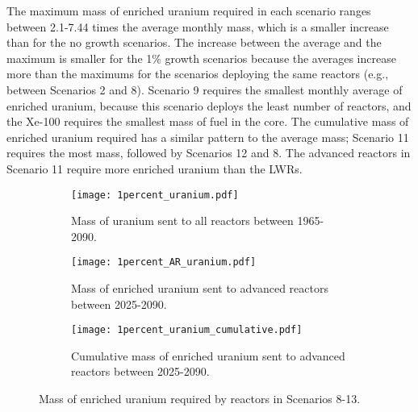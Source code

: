 The maximum mass of enriched uranium required in each scenario ranges 
between 2.1-7.44 times the average monthly mass, which is a smaller increase 
than for the no growth scenarios. The increase between 
the average and the maximum is smaller for the 1\% growth scenarios because
the averages increase more than the maximums for the scenarios deploying the 
same reactors (e.g., between Scenarios 2 and 8). Scenario 9 requires the 
smallest monthly average of enriched uranium, because this scenario 
deploys the least number of reactors, and the Xe-100 requires the smallest 
mass of fuel in the core. The cumulative mass 
of enriched uranium required has a similar pattern to the average mass;
Scenario 11 requires the most mass, followed by Scenarios 12 
and 8. The advanced reactors in Scenario 11 require more enriched uranium 
than the \glspl{LWR}. 

\begin{figure}
    \centering
    \begin{subfigure}[b]{0.45\textwidth}
        \centering
        \texttt{[image: 1percent\_uranium.pdf]}
        \caption{Mass of uranium sent to all reactors between 1965-2090.}
        \label{fig:1percent_all_uranium}
    \end{subfigure}
    \hfill
    \begin{subfigure}[b]{0.45\textwidth}
        \centering
        \texttt{[image: 1percent\_AR\_uranium.pdf]}
        \caption{Mass of enriched uranium sent to advanced reactors 
        between 2025-2090.}
        \label{fig:1percent_AR_uranium}
    \end{subfigure}
    \begin{subfigure}[b]{0.45\textwidth}
        \centering
        \texttt{[image: 1percent\_uranium\_cumulative.pdf]}
        \caption{Cumulative mass of enriched uranium sent to advanced reactors 
        between 2025-2090.}
        \label{fig:1percent_uranium_cumulative}
    \end{subfigure}
       \caption{Mass of enriched uranium required by reactors
        in Scenarios 8-13.}
       \label{fig:1percent_uranium}
\end{figure}

